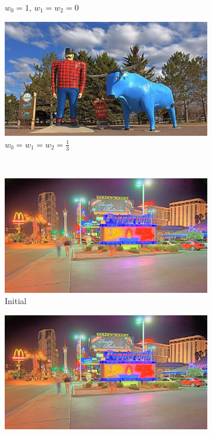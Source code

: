 {\begin{landscape}
\begin{figure}
\begin{subfigure}[b]{0.40\textwidth}
    \caption{$w_0 = 1$, $w_1 = w_2 = 0$}
    \label{FigStyle:VerIIa_paul_bunyan}
\end{subfigure}\hfill
\begin{subfigure}[b]{0.40\textwidth}
   \centering
    \includegraphics[width=\textwidth]{figures/chapter5/style_based/PaulBunyan_hdrcandy_w0_w1_w2_small.jpg}
    \caption{$w_0 = w_1 = w_2 = \frac{1}{3}$}
    \label{FigStyle:VerIIb_paul_bunyan}
\end{subfigure}\\
\begin{subfigure}[b]{0.40\textwidth}
    \centering
    \includegraphics[width=\textwidth]{figures/chapter5/style_based/Peppermill_hdrcandy_v1_small.jpg}
    \caption{Initial}
    \label{FigStyle:original_peppermill}
\end{subfigure}\hfill
\begin{subfigure}[b]{0.40\textwidth}
    \centering
    \includegraphics[width=\textwidth]{figures/chapter5/style_based/Peppermill_hdrcandy_v2_small.jpg}

\end{subfigure}
\end{figure}
\end{landscape}}
